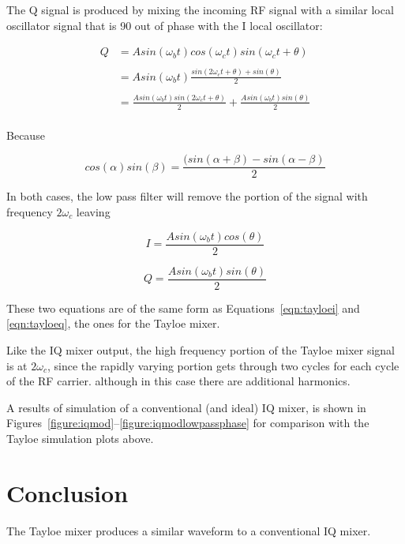 \documentclass[11pt, twoside]{article}
\begin{document}
The Q signal is produced by mixing the incoming RF signal with a
similar local oscillator signal that is 90{\degree} out of phase with
the I local oscillator:


\begin{align*}
  Q& = A sin({\omega_b}t) cos({\omega}_ct) sin({\omega}_ct + \theta) \\
  \\
  & = A sin({\omega_b}t) \frac{sin(2{\omega}_ct + \theta) + sin(\theta)}{2}\\
  \\
& = \frac{A sin({\omega_b}t)sin(2{\omega}_ct + \theta)}{2} + \frac{A sin({\omega_b}t)sin(\theta)}{2}\\
\end{align*}

Because

\begin{equation*}
  cos(\alpha)sin(\beta) = \frac{(sin(\alpha + \beta) - sin(\alpha - \beta)}{2} 
\end{equation*}

In both cases, the low pass filter will remove the portion of the
signal with frequency $2{\omega_c}$ leaving

\begin{equation*}
  I = \frac{A sin({\omega_b}t)cos(\theta)}{2}
\end{equation*}

\begin{equation*}
  Q = \frac{A sin({\omega_b}t)sin(\theta)}{2}
\end{equation*}

These two equations are of the same form as
Equations~\ref{eqn:tayloei} and \ref{eqn:tayloeq}, the ones for the
Tayloe mixer.

Like the IQ mixer output, the high frequency portion of the Tayloe
mixer signal is at $2\omega_c$, since the rapidly varying portion gets
through two cycles for each cycle of the RF carrier.  although in this
case there are additional harmonics.

A results of simulation of a conventional (and ideal) IQ mixer, is
shown in Figures~\ref{figure:iqmod}--\ref{figure:iqmodlowpassphase}
for comparison with the Tayloe simulation plots above.

\section{Conclusion}

The Tayloe mixer produces a similar waveform to a conventional IQ
mixer.
\end{document}
